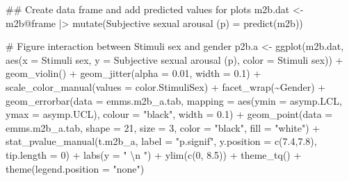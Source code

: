 \documentclass[
  bookmarksnumbered]{article}
\newenvironment{Shaded}{\begin{snugshade}}{\end{snugshade}}
\newcommand{\AttributeTok}[1]{\textcolor[rgb]{0.80,0.80,0.80}{#1}}
\newcommand{\CommentTok}[1]{\textcolor[rgb]{0.50,0.62,0.50}{#1}}
\newcommand{\DecValTok}[1]{\textcolor[rgb]{0.86,0.86,0.80}{#1}}
\newcommand{\DocumentationTok}[1]{\textcolor[rgb]{0.50,0.62,0.50}{#1}}
\newcommand{\FloatTok}[1]{\textcolor[rgb]{0.75,0.75,0.82}{#1}}
\newcommand{\FunctionTok}[1]{\textcolor[rgb]{0.94,0.94,0.56}{#1}}
\newcommand{\NormalTok}[1]{\textcolor[rgb]{0.80,0.80,0.80}{#1}}
\newcommand{\OtherTok}[1]{\textcolor[rgb]{0.94,0.94,0.56}{#1}}
\newcommand{\SpecialCharTok}[1]{\textcolor[rgb]{0.86,0.64,0.64}{#1}}
\newcommand{\StringTok}[1]{\textcolor[rgb]{0.80,0.58,0.58}{#1}}
\begin{document}
\begin{Shaded}
\begin{Highlighting}[]
\DocumentationTok{\#\# Create data frame and add predicted values for plots}
\NormalTok{m2b.dat }\OtherTok{\textless{}{-}}\NormalTok{ m2b}\SpecialCharTok{@}\NormalTok{frame }\SpecialCharTok{|\textgreater{}} 
  \FunctionTok{mutate}\NormalTok{(}\StringTok{\textasciigrave{}}\AttributeTok{Subjective sexual arousal (p)}\StringTok{\textasciigrave{}} \OtherTok{=} \FunctionTok{predict}\NormalTok{(m2b))}

\CommentTok{\# Figure interaction between Stimuli sex and gender}
\NormalTok{p2b.a }\OtherTok{\textless{}{-}} \FunctionTok{ggplot}\NormalTok{(m2b.dat, }\FunctionTok{aes}\NormalTok{(}\AttributeTok{x =} \StringTok{\textasciigrave{}}\AttributeTok{Stimuli sex}\StringTok{\textasciigrave{}}\NormalTok{, }
                             \AttributeTok{y =} \StringTok{\textasciigrave{}}\AttributeTok{Subjective sexual arousal (p)}\StringTok{\textasciigrave{}}\NormalTok{, }
                             \AttributeTok{color =} \StringTok{\textasciigrave{}}\AttributeTok{Stimuli sex}\StringTok{\textasciigrave{}}\NormalTok{)) }\SpecialCharTok{+}
  \FunctionTok{geom\_violin}\NormalTok{() }\SpecialCharTok{+}
  \FunctionTok{geom\_jitter}\NormalTok{(}\AttributeTok{alpha =} \FloatTok{0.01}\NormalTok{, }\AttributeTok{width =} \FloatTok{0.1}\NormalTok{) }\SpecialCharTok{+}
  \FunctionTok{scale\_color\_manual}\NormalTok{(}\AttributeTok{values =}\NormalTok{ color.StimuliSex) }\SpecialCharTok{+}
  \FunctionTok{facet\_wrap}\NormalTok{(}\SpecialCharTok{\textasciitilde{}}\NormalTok{Gender) }\SpecialCharTok{+}
  \FunctionTok{geom\_errorbar}\NormalTok{(}\AttributeTok{data =}\NormalTok{ emms.m2b\_a.tab, }
                \AttributeTok{mapping =} \FunctionTok{aes}\NormalTok{(}\AttributeTok{ymin =}\NormalTok{ asymp.LCL, }\AttributeTok{ymax =}\NormalTok{ asymp.UCL), }
                \AttributeTok{colour =} \StringTok{"black"}\NormalTok{, }\AttributeTok{width =} \FloatTok{0.1}\NormalTok{) }\SpecialCharTok{+}
  \FunctionTok{geom\_point}\NormalTok{(}\AttributeTok{data =}\NormalTok{ emms.m2b\_a.tab, }
             \AttributeTok{shape =} \DecValTok{21}\NormalTok{, }\AttributeTok{size =} \DecValTok{3}\NormalTok{,}
             \AttributeTok{color =} \StringTok{"black"}\NormalTok{, }\AttributeTok{fill =} \StringTok{"white"}\NormalTok{) }\SpecialCharTok{+}
  \FunctionTok{stat\_pvalue\_manual}\NormalTok{(t.m2b\_a, }
                     \AttributeTok{label =} \StringTok{"p.signif"}\NormalTok{, }
                     \AttributeTok{y.position =} \FunctionTok{c}\NormalTok{(}\FloatTok{7.4}\NormalTok{,}\FloatTok{7.8}\NormalTok{), }
                     \AttributeTok{tip.length =} \DecValTok{0}\NormalTok{) }\SpecialCharTok{+}
  \FunctionTok{labs}\NormalTok{(}\AttributeTok{y =} \StringTok{" }\SpecialCharTok{\textbackslash{}n}\StringTok{ "}\NormalTok{)  }\SpecialCharTok{+}
  \FunctionTok{ylim}\NormalTok{(}\FunctionTok{c}\NormalTok{(}\DecValTok{0}\NormalTok{, }\FloatTok{8.5}\NormalTok{)) }\SpecialCharTok{+}
  \FunctionTok{theme\_tq}\NormalTok{() }\SpecialCharTok{+}
  \FunctionTok{theme}\NormalTok{(}\AttributeTok{legend.position =} \StringTok{"none"}\NormalTok{)}


\end{Highlighting}
\end{Shaded}
\end{document}
